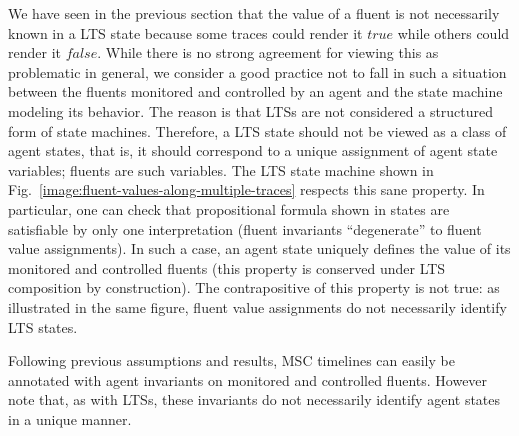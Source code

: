 We have seen in the previous section that the value of a fluent is not necessarily known in a LTS state because some traces could render it $true$ while others could render it $false$. While there is no strong agreement for viewing this as problematic in general, we consider a good practice not to fall in such a situation between the fluents monitored and controlled by an agent and the state machine modeling its behavior. The reason is that LTSs are not considered a structured form of state machines. Therefore, a LTS state should not be viewed as a class of agent states, that is, it should correspond to a unique assignment of agent state variables; fluents are such variables. The LTS state machine shown in Fig.~\ref{image:fluent-values-along-multiple-traces} respects this sane property. In particular, one can check that propositional formula shown in states are satisfiable by only one interpretation (fluent invariants ``degenerate'' to fluent value assignments). In such a case, an agent state uniquely defines the value of its monitored and controlled fluents (this property is conserved under LTS composition by construction). The contrapositive of this property is not true: as illustrated in the same figure, fluent value assignments do not necessarily identify LTS states.

Following previous assumptions and results, MSC timelines can easily be annotated with agent invariants on monitored and controlled fluents. However note that, as with LTSs, these invariants do not necessarily identify agent states in a unique manner.
